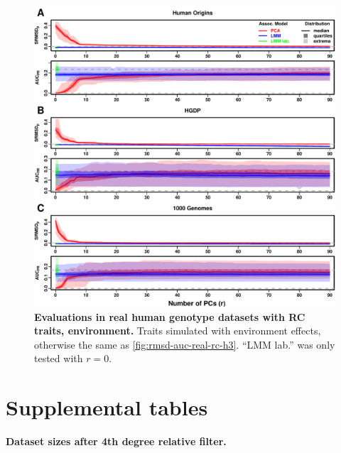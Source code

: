 \documentclass[11pt]{article}
\begin{document}
\begin{figure}[hp!]
  \centering
  \includegraphics[width=\textwidth,height=\textheight,keepaspectratio]{m_causal_fac-27/h0.3/env0.3-0.2/rmsd-auc-real.pdf}
  \caption{
    {\bf Evaluations in real human genotype datasets with RC traits, environment.}
    Traits simulated with environment effects, otherwise the same as \cref{fig:rmsd-auc-real-rc-h3}.
    ``LMM lab.'' was only tested with $r=0$.
  }
  \label{fig:rmsd-auc-real-rc-env}
\end{figure}


\clearpage

\section*{Supplemental tables}

\begin{table}[hb!]
  \centering
  \caption{
    \textbf{Dataset sizes after 4th degree relative filter.}
  }
  \label{tab:king_cutoff}
\end{table}
\end{document}
